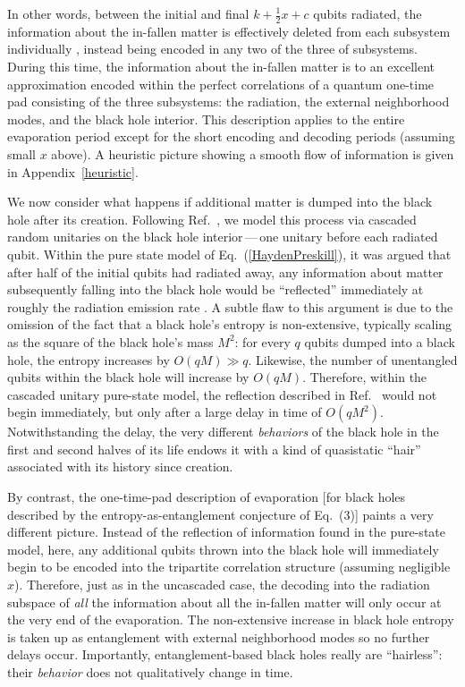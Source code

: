 \documentclass[aps,prl,amsmath,amssymb,floatfix,12pt]{revtex4}
\begin{document}
In other words, between the initial and final $k+\frac{1}{2}x+c$ qubits
radiated, the information about the in-fallen matter is effectively
deleted from each subsystem individually \cite{me,Kretschmann}, instead
being encoded in any two of the three of subsystems. During this time,
the information about the in-fallen matter is to an excellent
approximation encoded within the perfect correlations of a quantum
one-time pad \cite{me,Leung02} consisting of the three subsystems:
the radiation, the external neighborhood modes, and the black hole
interior. This description applies to the entire evaporation period
except for the short encoding and decoding periods (assuming small 
$x$ above). A heuristic picture showing a smooth flow of information 
is given in Appendix~\ref{heuristic}.

We now consider what happens if additional matter is dumped into the 
black hole after its creation. Following Ref.~, 
we model this process via cascaded random unitaries on the black hole 
interior\,---\,one unitary before each radiated qubit. Within the pure 
state model of Eq.~(\ref{HaydenPreskill}), it was argued \cite{Hayden07} 
that after half of the initial qubits had radiated away, any information 
about matter subsequently falling into the black hole would be ``reflected'' 
immediately at roughly the radiation emission rate \cite{Hayden07}. A
subtle flaw to this argument is due to the omission of the fact that a
black hole's entropy is non-extensive, typically scaling as the square
of the black hole's mass $M^2$: for every $q$ qubits dumped into
a black hole, the entropy increases by $O(qM)\gg q$. Likewise, the
number of unentangled qubits within the black hole will increase by
$O(qM)$. Therefore, within the cascaded unitary pure-state model,
the reflection described in Ref.~ would not begin
immediately, but only after a large delay in time of $O(qM^2)$.
%
Notwithstanding the delay, the very different {\it behaviors\/} of
the black hole in the first and second halves of its life endows
it with a kind of quasistatic ``hair'' associated with its history
since creation.

By contrast, the one-time-pad description of evaporation [for black 
holes described by the entropy-as-entanglement conjecture of Eq.~(3)] 
paints a very different picture. Instead of the reflection of information 
found in the pure-state model, here, any additional qubits thrown into 
the black hole will immediately begin to be encoded into the tripartite 
correlation structure (assuming negligible $x$). Therefore, just as in 
the uncascaded case, the decoding into the radiation subspace of {\it 
all} the information about all the in-fallen matter will only occur at 
the very end of the evaporation. The non-extensive increase in black 
hole entropy is taken up as entanglement with external neighborhood 
modes so no further delays occur. 
%
Importantly, entanglement-based black holes really are ``hairless'': 
their {\it behavior\/} does not qualitatively change in time.
\end{document}
